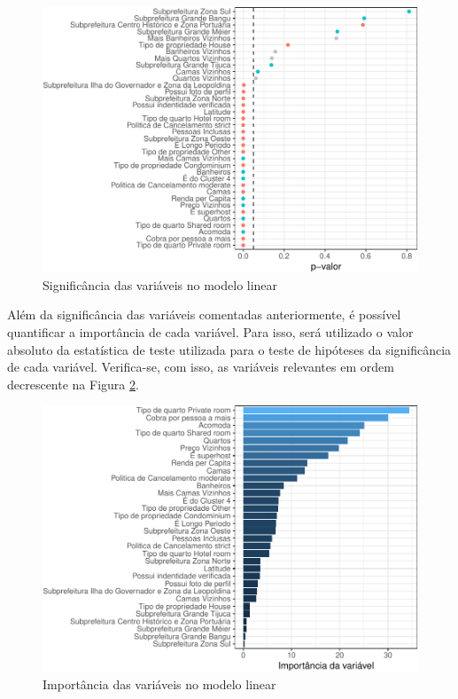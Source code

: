 \documentclass[
	12pt,				%
	a4paper,		%
	oneside,    %
	chapter=TITLE,		   %
	section=TITLE,		   %
	subsection=TITLE,	   %
	subsubsection=TITLE, %
	english,			%
	french,				%
	spanish,			%
	brazil,				%
]{abntex2}
\begin{document}
\begin{figure}
\centering
\includegraphics{00-TCC_files/figure-latex/significancia_ml-1.pdf}
\caption{\label{significancia_ml}Significância das variáveis no modelo
linear}
\end{figure}

Além da significância das variáveis comentadas anteriormente, é possível
quantificar a importância de cada variável. Para isso, será utilizado o
valor absoluto da estatística de teste utilizada para o teste de
hipóteses da significância de cada variável. Verifica-se, com isso, as
variáveis relevantes em ordem decrescente na Figura \ref{imp_ml}.

\begin{figure}
\centering
\includegraphics{00-TCC_files/figure-latex/imp_ml-1.pdf}
\caption{\label{imp_ml}Importância das variáveis no modelo linear}
\end{figure}
\end{document}
